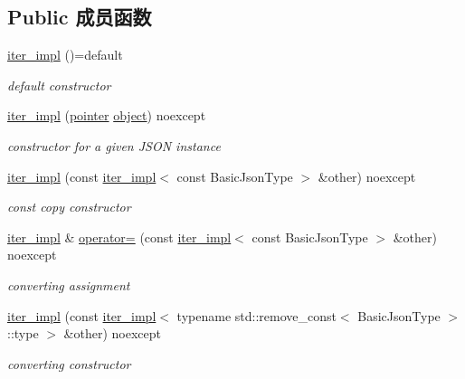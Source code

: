 \subsection*{Public 成员函数}
\begin{DoxyCompactItemize}
\item 
\mbox{\hyperlink{classnlohmann_1_1detail_1_1iter__impl_a19aa457f9c4af1b7e3af59839132cc5c}{iter\+\_\+impl}} ()=default
\begin{DoxyCompactList}\small\item\em default constructor \end{DoxyCompactList}\item 
\mbox{\hyperlink{classnlohmann_1_1detail_1_1iter__impl_a88a00484ac201c52fc5f613d88a2918b}{iter\+\_\+impl}} (\mbox{\hyperlink{classnlohmann_1_1detail_1_1iter__impl_a69e52f890ce8c556fd68ce109e24b360}{pointer}} \mbox{\hyperlink{namespacenlohmann_1_1detail_a1ed8fc6239da25abcaf681d30ace4985aa8cfde6331bd59eb2ac96f8911c4b666}{object}}) noexcept
\begin{DoxyCompactList}\small\item\em constructor for a given J\+S\+ON instance \end{DoxyCompactList}\item 
\mbox{\hyperlink{classnlohmann_1_1detail_1_1iter__impl_a71f84fb6e009619f12972bcf9002b8cd}{iter\+\_\+impl}} (const \mbox{\hyperlink{classnlohmann_1_1detail_1_1iter__impl}{iter\+\_\+impl}}$<$ const Basic\+Json\+Type $>$ \&other) noexcept
\begin{DoxyCompactList}\small\item\em const copy constructor \end{DoxyCompactList}\item 
\mbox{\hyperlink{classnlohmann_1_1detail_1_1iter__impl}{iter\+\_\+impl}} \& \mbox{\hyperlink{classnlohmann_1_1detail_1_1iter__impl_a9a5cd7864a8f848ef107d3f5a330f5e7}{operator=}} (const \mbox{\hyperlink{classnlohmann_1_1detail_1_1iter__impl}{iter\+\_\+impl}}$<$ const Basic\+Json\+Type $>$ \&other) noexcept
\begin{DoxyCompactList}\small\item\em converting assignment \end{DoxyCompactList}\item 
\mbox{\hyperlink{classnlohmann_1_1detail_1_1iter__impl_a867f7eb55091be31b013adb3e46816d3}{iter\+\_\+impl}} (const \mbox{\hyperlink{classnlohmann_1_1detail_1_1iter__impl}{iter\+\_\+impl}}$<$ typename std\+::remove\+\_\+const$<$ Basic\+Json\+Type $>$\+::type $>$ \&other) noexcept
\begin{DoxyCompactList}\small\item\em converting constructor \end{DoxyCompactList}\item 

\end{DoxyCompactItemize}
